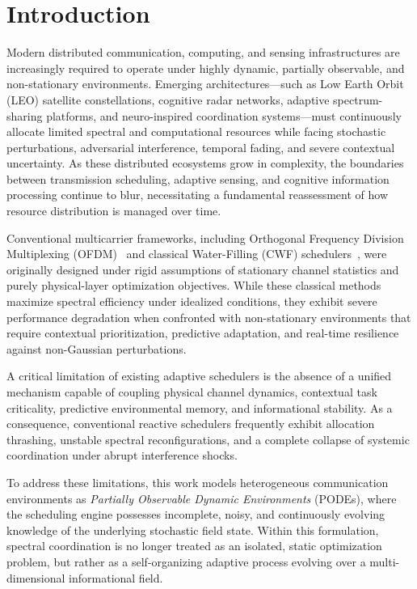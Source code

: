 \documentclass[journal,10pt,twocolumn,twoside]{IEEEtran}
\begin{document}
\section{Introduction}
\label{sec:introduction}

Modern distributed communication, computing, and sensing infrastructures are increasingly required to operate under highly dynamic, partially observable, and non-stationary environments. Emerging architectures---such as Low Earth Orbit (LEO) satellite constellations, cognitive radar networks, adaptive spectrum-sharing platforms, and neuro-inspired coordination systems---must continuously allocate limited spectral and computational resources while facing stochastic perturbations, adversarial interference, temporal fading, and severe contextual uncertainty. As these distributed ecosystems grow in complexity, the boundaries between transmission scheduling, adaptive sensing, and cognitive information processing continue to blur, necessitating a fundamental reassessment of how resource distribution is managed over time.

Conventional multicarrier frameworks, including Orthogonal Frequency Division Multiplexing (OFDM)~\cite{weinstein1971data} and classical Water-Filling (CWF) schedulers~\cite{yu2002water}, were originally designed under rigid assumptions of stationary channel statistics and purely physical-layer optimization objectives. While these classical methods maximize spectral efficiency under idealized conditions, they exhibit severe performance degradation when confronted with non-stationary environments that require contextual prioritization, predictive adaptation, and real-time resilience against non-Gaussian perturbations.

A critical limitation of existing adaptive schedulers is the absence of a unified mechanism capable of coupling physical channel dynamics, contextual task criticality, predictive environmental memory, and informational stability. As a consequence, conventional reactive schedulers frequently exhibit allocation thrashing, unstable spectral reconfigurations, and a complete collapse of systemic coordination under abrupt interference shocks.

To address these limitations, this work models heterogeneous communication environments as \textit{Partially Observable Dynamic Environments} (PODEs), where the scheduling engine possesses incomplete, noisy, and continuously evolving knowledge of the underlying stochastic field state. Within this formulation, spectral coordination is no longer treated as an isolated, static optimization problem, but rather as a self-organizing adaptive process evolving over a multi-dimensional informational field.
\end{document}

